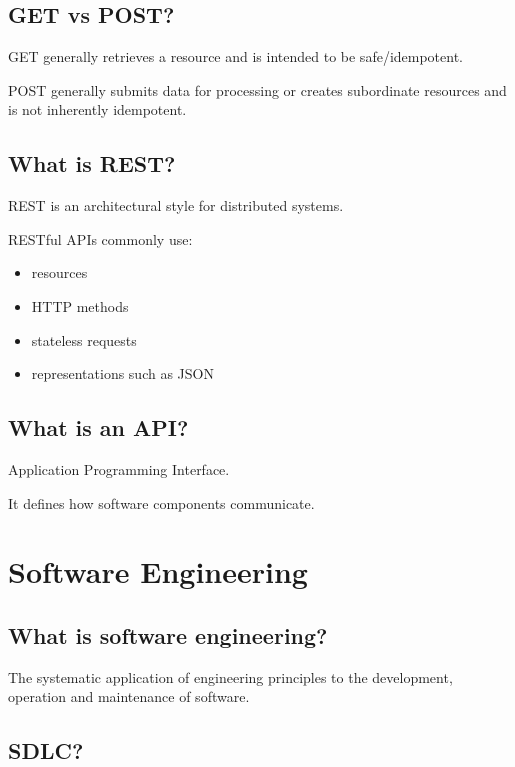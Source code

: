 \medskip

\subsection{GET vs POST?}

GET generally retrieves a resource and is intended to be safe/idempotent.

POST generally submits data for processing or creates subordinate resources and is not inherently idempotent.

\medskip

\subsection{What is REST?}

REST is an architectural style for distributed systems.

RESTful APIs commonly use:

\begin{itemize}
  \item resources
  \item HTTP methods
  \item stateless requests
  \item representations such as JSON
\end{itemize}

\medskip

\subsection{What is an API?}

Application Programming Interface.

It defines how software components communicate.

\medskip

\section{Software Engineering}

\subsection{What is software engineering?}

The systematic application of engineering principles to the development, operation and maintenance of software.

\medskip

\subsection{SDLC?}

